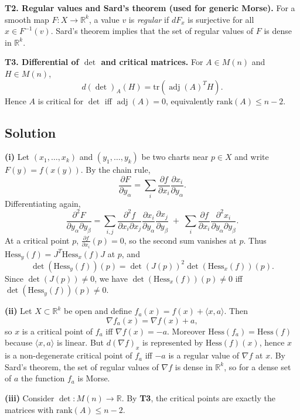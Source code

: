 \documentclass[12pt,a4paper]{article}
\theoremstyle{plain}
\theoremstyle{definition}      %
\begin{document}
	\medskip
	\noindent\textbf{T2. Regular values and Sard's theorem (used for generic Morse).}
	For a smooth map $F:X\to\mathbb{R}^k$, a value $v$ is \emph{regular} if $dF_x$ is surjective for all $x\in F^{-1}(v)$.
	Sard's theorem implies that the set of regular values of $F$ is dense in $\mathbb{R}^k$.
	
	\medskip
	\noindent\textbf{T3. Differential of $\det$ and critical matrices.}
	For $A\in M(n)$ and $H\in M(n)$,
	\[
	d(\det)_A(H)=\mathrm{tr}(\operatorname{adj}(A)^T H).
	\]
	Hence $A$ is critical for $\det$ iff $\operatorname{adj}(A)=0$, equivalently $\mathrm{rank}(A)\le n-2$.
	
	\medskip
	\subsection*{Solution}
	
	\noindent\textbf{(i)}
	Let $(x_1,\dots,x_k)$ and $(y_1,\dots,y_k)$ be two charts near $p\in X$ and write $F(y)=f(x(y))$.
	By the chain rule,
	\[
	\frac{\partial F}{\partial y_\alpha}
	=\sum_i \frac{\partial f}{\partial x_i}\frac{\partial x_i}{\partial y_\alpha}.
	\]
	Differentiating again,
	\[
	\frac{\partial^2 F}{\partial y_\alpha\partial y_\beta}
	=\sum_{i,j}\frac{\partial^2 f}{\partial x_i\partial x_j}
	\frac{\partial x_i}{\partial y_\alpha}\frac{\partial x_j}{\partial y_\beta}
	\;+\;\sum_i \frac{\partial f}{\partial x_i}\frac{\partial^2 x_i}{\partial y_\alpha\partial y_\beta}.
	\]
	At a critical point $p$, $\frac{\partial f}{\partial x_i}(p)=0$, so the second sum vanishes at $p$.
	Thus $\mathrm{Hess}_y(f)=J^T\mathrm{Hess}_x(f)J$ at $p$, and
	\[
	\det(\mathrm{Hess}_y(f))(p)=\det(J(p))^2\det(\mathrm{Hess}_x(f))(p).
	\]
	Since $\det(J(p))\neq 0$, we have $\det(\mathrm{Hess}_x(f))(p)\neq 0$ iff $\det(\mathrm{Hess}_y(f))(p)\neq 0$.
	
	\medskip
	\noindent\textbf{(ii)}
	Let $X\subset\mathbb{R}^k$ be open and define $f_a(x)=f(x)+\langle x,a\rangle$.
	Then
	\[
	\nabla f_a(x)=\nabla f(x)+a,
	\]
	so $x$ is a critical point of $f_a$ iff $\nabla f(x)=-a$.
	Moreover $\mathrm{Hess}(f_a)=\mathrm{Hess}(f)$ because $\langle x,a\rangle$ is linear.
	But $d(\nabla f)_x$ is represented by $\mathrm{Hess}(f)(x)$, hence $x$ is a non-degenerate critical point of $f_a$
	iff $-a$ is a regular value of $\nabla f$ at $x$.
	By Sard's theorem, the set of regular values of $\nabla f$ is dense in $\mathbb{R}^k$,
	so for a dense set of $a$ the function $f_a$ is Morse.
	
	\medskip
	\noindent\textbf{(iii)}
	Consider $\det:M(n)\to\mathbb{R}$. By \textbf{T3}, the critical points are exactly the matrices with
	$\mathrm{rank}(A)\le n-2$.
	
\end{document}
